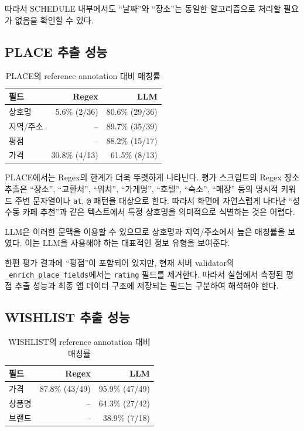 \documentclass[11pt,a4paper]{article}
\begin{document}
따라서 SCHEDULE 내부에서도 ``날짜''와 ``장소''는 동일한 알고리즘으로 처리할 필요가 없음을 확인할 수 있다.

\subsection{PLACE 추출 성능}

\begin{table}[H]
\centering
\small
\begin{tabularx}{0.92\linewidth}{l r r}
\toprule
\textbf{필드} & \textbf{Regex} & \textbf{LLM}\\
\midrule
상호명 & 5.6\% (2/36) & 80.6\% (29/36)\\
지역/주소 & -- & 89.7\% (35/39)\\
평점 & -- & 88.2\% (15/17)\\
가격 & 30.8\% (4/13) & 61.5\% (8/13)\\
\bottomrule
\end{tabularx}
\caption{PLACE의 reference annotation 대비 매칭률}
\end{table}

PLACE에서는 Regex의 한계가 더욱 뚜렷하게 나타난다. 평가 스크립트의 Regex 장소 추출은 ``장소'', ``교환처'', ``위치'', ``가게명'', ``호텔'', ``숙소'', ``매장'' 등의 명시적 키워드 주변 문자열이나 \texttt{at}, \texttt{@} 패턴을 대상으로 한다. 따라서 화면에 자연스럽게 나타난 ``성수동 카페 추천''과 같은 텍스트에서 특정 상호명을 의미적으로 식별하는 것은 어렵다.

LLM은 이러한 문맥을 이용할 수 있으므로 상호명과 지역/주소에서 높은 매칭률을 보였다. 이는 LLM을 사용해야 하는 대표적인 정보 유형을 보여준다.

한편 평가 결과에 ``평점''이 포함되어 있지만, 현재 서버 validator의 \texttt{\_enrich\_place\_fields}에서는 \texttt{rating} 필드를 제거한다. 따라서 실험에서 측정된 평점 추출 성능과 최종 앱 데이터 구조에 저장되는 필드는 구분하여 해석해야 한다.

\subsection{WISHLIST 추출 성능}

\begin{table}[H]
\centering
\small
\begin{tabularx}{0.92\linewidth}{l r r}
\toprule
\textbf{필드} & \textbf{Regex} & \textbf{LLM}\\
\midrule
가격 & 87.8\% (43/49) & 95.9\% (47/49)\\
상품명 & -- & 64.3\% (27/42)\\
브랜드 & -- & 38.9\% (7/18)\\
\bottomrule
\end{tabularx}
\caption{WISHLIST의 reference annotation 대비 매칭률}
\end{table}
\end{document}
